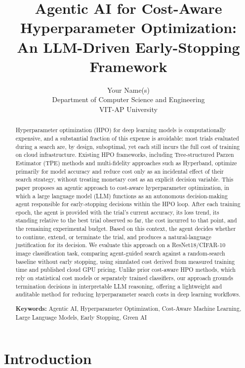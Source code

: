\documentclass[11pt]{article}
\title{\textbf{Agentic AI for Cost-Aware Hyperparameter Optimization: \\ An LLM-Driven Early-Stopping Framework}}
\author{Your Name(s) \\ Department of Computer Science and Engineering \\ VIT-AP University}
\date{}
\begin{document}
\maketitle

\begin{abstract}
Hyperparameter optimization (HPO) for deep learning models is computationally expensive, and a substantial fraction of this expense is avoidable: most trials evaluated during a search are, by design, suboptimal, yet each still incurs the full cost of training on cloud infrastructure. Existing HPO frameworks, including Tree-structured Parzen Estimator (TPE) methods and multi-fidelity approaches such as Hyperband, optimize primarily for model accuracy and reduce cost only as an incidental effect of their search strategy, without treating monetary cost as an explicit decision variable. This paper proposes an agentic approach to cost-aware hyperparameter optimization, in which a large language model (LLM) functions as an autonomous decision-making agent responsible for early-stopping decisions within the HPO loop. After each training epoch, the agent is provided with the trial's current accuracy, its loss trend, its standing relative to the best trial observed so far, the cost incurred to that point, and the remaining experimental budget. Based on this context, the agent decides whether to continue, extend, or terminate the trial, and produces a natural-language justification for its decision. We evaluate this approach on a ResNet18/CIFAR-10 image classification task, comparing agent-guided search against a random-search baseline without early stopping, using simulated cost derived from measured training time and published cloud GPU pricing. Unlike prior cost-aware HPO methods, which rely on statistical cost models or separately trained classifiers, our approach grounds termination decisions in interpretable LLM reasoning, offering a lightweight and auditable method for reducing hyperparameter search costs in deep learning workflows.

\vspace{0.5em}
\noindent\textbf{Keywords:} Agentic AI, Hyperparameter Optimization, Cost-Aware Machine Learning, Large Language Models, Early Stopping, Green AI
\end{abstract}

\section{Introduction}
\label{sec:intro}
\end{document}
